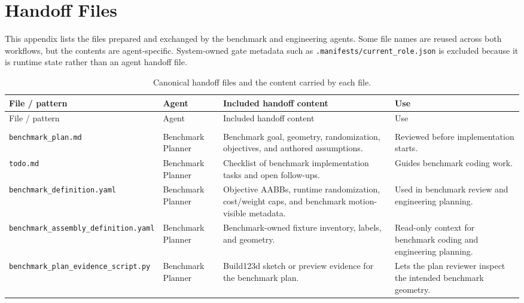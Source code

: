 \documentclass[conference]{IEEEtran}
\begin{document}
\endgroup

\section{Handoff Files}
This appendix lists the files prepared and exchanged by the benchmark and engineering agents. Some file names are reused across both workflows, but the contents are agent-specific. System-owned gate metadata such as \texttt{.manifests/current\_role.json} is excluded because it is runtime state rather than an agent handoff file.

\begingroup
\scriptsize
\setlength{\tabcolsep}{2pt}
\renewcommand{\arraystretch}{0.94}
\sloppy
\begin{longtable}{@{}%
  >{\raggedright\arraybackslash}p{}%
  >{\raggedright\arraybackslash}p{}%
  >{\raggedright\arraybackslash}p{}%
  >{\raggedright\arraybackslash}p{}@{}}
\caption{Canonical handoff files and the content carried by each file.}\label{tab:handoff-files}\\
\toprule\noalign{}
File / pattern & Agent & Included handoff content & Use \\
\midrule\noalign{}
\endfirsthead
\toprule\noalign{}
File / pattern & Agent & Included handoff content & Use \\
\midrule\noalign{}
\endhead
\bottomrule\noalign{}
\endlastfoot
\multicolumn{4}{@{}l}{\textbf{Benchmark agents}}\\
\texttt{benchmark\_plan.md} & Benchmark Planner & Benchmark goal, geometry, randomization, objectives, and authored assumptions. & Reviewed before implementation starts. \\
\texttt{todo.md} & Benchmark Planner & Checklist of benchmark implementation tasks and open follow-ups. & Guides benchmark coding work. \\
\texttt{benchmark\_definition.yaml} & Benchmark Planner & Objective AABBs, runtime randomization, cost/weight caps, and benchmark motion-visible metadata. & Used in benchmark review and engineering planning. \\
\texttt{benchmark\_assembly\_definition.yaml} & Benchmark Planner & Benchmark-owned fixture inventory, labels, and geometry. & Read-only context for benchmark coding and engineering planning. \\
\texttt{benchmark\_plan\_evidence\_script.py} & Benchmark Planner & Build123d sketch or preview evidence for the benchmark plan. & Lets the plan reviewer inspect the intended benchmark geometry. \\

\end{longtable}
\end{document}
